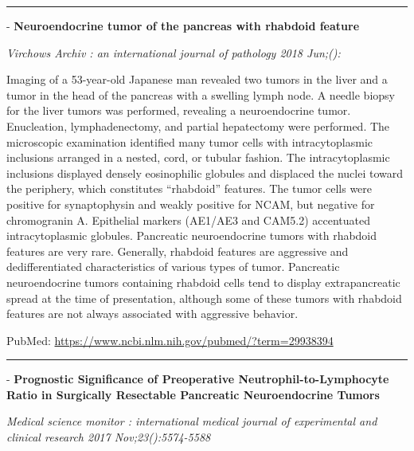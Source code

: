 \documentclass[]{article}
\begin{document}
{}

\begin{center}\rule{0.5\linewidth}{\linethickness}\end{center}

 - \textbf{Neuroendocrine tumor of the pancreas with rhabdoid feature}

\emph{Virchows Archiv : an international journal of pathology 2018
Jun;():}

Imaging of a 53-year-old Japanese man revealed two tumors in the liver
and a tumor in the head of the pancreas with a swelling lymph node. A
needle biopsy for the liver tumors was performed, revealing a
neuroendocrine tumor. Enucleation, lymphadenectomy, and partial
hepatectomy were performed. The microscopic examination identified many
tumor cells with intracytoplasmic inclusions arranged in a nested, cord,
or tubular fashion. The intracytoplasmic inclusions displayed densely
eosinophilic globules and displaced the nuclei toward the periphery,
which constitutes ``rhabdoid'' features. The tumor cells were positive
for synaptophysin and weakly positive for NCAM, but negative for
chromogranin A. Epithelial markers (AE1/AE3 and CAM5.2) accentuated
intracytoplasmic globules. Pancreatic neuroendocrine tumors with
rhabdoid features are very rare. Generally, rhabdoid features are
aggressive and dedifferentiated characteristics of various types of
tumor. Pancreatic neuroendocrine tumors containing rhabdoid cells tend
to display extrapancreatic spread at the time of presentation, although
some of these tumors with rhabdoid features are not always associated
with aggressive behavior.

PubMed: \url{https://www.ncbi.nlm.nih.gov/pubmed/?term=29938394}

{}

{}

\begin{center}\rule{0.5\linewidth}{\linethickness}\end{center}

 - \textbf{Prognostic Significance of Preoperative
Neutrophil-to-Lymphocyte Ratio in Surgically Resectable Pancreatic
Neuroendocrine Tumors}

\emph{Medical science monitor : international medical journal of
experimental and clinical research 2017 Nov;23():5574-5588}
\end{document}
